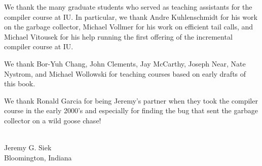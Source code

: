 \documentclass[7x10]{TimesAPriori_MIT}%
\begin{document}
We thank the many graduate students who served as teaching assistants
for the compiler course at IU. In particular, we thank Andre
Kuhlenschmidt for his work on the garbage collector, Michael Vollmer
for his work on efficient tail calls, and Michael Vitousek for his
help running the first offering of the incremental compiler course at
IU.

We thank Bor-Yuh Chang, John Clements, Jay McCarthy, Joseph Near, Nate
Nystrom, and Michael Wollowski for teaching courses based on early
drafts of this book.

We thank Ronald Garcia for being Jeremy's partner when they took the
compiler course in the early 2000's and especially for finding the bug
that sent the garbage collector on a wild goose chase!

\mbox{}\\
\noindent Jeremy G. Siek \\
Bloomington, Indiana

\mainmatter








\end{document}
